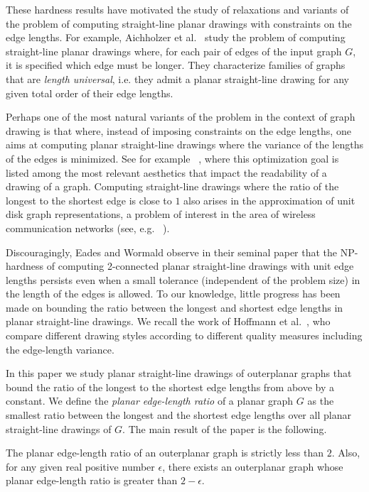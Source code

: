 \documentclass[orivec]{llncs}
\begin{document}
These hardness results have motivated the study of relaxations and variants of the problem of computing straight-line planar drawings with constraints on the edge lengths.
For example, Aichholzer et al.~\cite{DBLP:conf/cccg/AichholzerHKR14} study the problem of computing straight-line planar drawings where, for each pair of edges of the input graph $G$, it is specified which edge must be longer. They characterize families of graphs that are
{\em length universal}, i.e. they admit a planar straight-line drawing for any given total order of their edge lengths.

Perhaps one of the most natural variants of the problem in the context of graph drawing is that where, instead of imposing constraints on the edge lengths, one aims at computing planar straight-line drawings where the variance of the lengths of the edges is minimized. See for example ~\cite{DBLP:books/ph/BattistaETT99}, where this optimization goal is listed among the most relevant aesthetics that impact the readability of a drawing of a graph.
Computing straight-line drawings where the ratio of the longest to the shortest edge is close to $1$ also arises in the approximation of unit disk graph representations, a problem of interest in the area of wireless communication networks
(see, e.g. ~\cite{Chen2011,DBLP:conf/dialm/KuhnMW04}).

Discouragingly, Eades and Wormald observe in their seminal paper that the NP-hardness of computing 2-connected planar straight-line drawings with unit edge lengths persists even when a small tolerance (independent of the problem size) in the length of the edges is allowed. To our knowledge, little progress has been made on bounding the ratio between the longest and shortest edge lengths in planar straight-line drawings.  We recall the work of Hoffmann et al.~\cite{DBLP:conf/cccg/HoffmannKKR14}, who compare different drawing styles according to different quality measures including the edge-length variance.

In this paper we study planar straight-line drawings of outerplanar graphs that bound
the ratio of the longest to the shortest edge lengths from above by a constant.
We define the {\em planar edge-length ratio} of a planar graph $G$ as the smallest ratio between the longest and the shortest edge lengths over all planar straight-line drawings of $G$. The main result of the paper is the following.

\begin{theorem}\label{th:main}
The planar edge-length ratio of an outerplanar graph is strictly less than $2$. Also, for any given real positive number $\epsilon$, there exists an outerplanar graph whose planar edge-length ratio is greater than $2 - \epsilon$.
\end{theorem}
\end{document}
